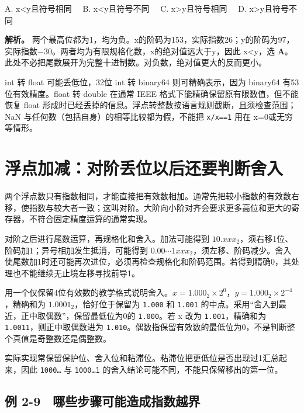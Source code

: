 A. x\textless y且符号相同　 B. x\textless y且符号不同　 C. x\textgreater y且符号相同　 D. x\textgreater y且符号不同


\textbf{解析。} 两个最高位都为1，均为负。x的阶码为153，实际指数26；y的阶码为97，实际指数−30。两者均为有限规格化数，x的绝对值远大于y，因此 x\textless y，选 \textbf{A}。此处不必把尾数展开为完整十进制数。对负数，绝对值更大的反而更小。

int 转 float 可能丢低位，32位 int 转 binary64 则可精确表示，因为 binary64 有53位有效精度。float 转 double 在通常 IEEE 格式下能精确保留原有限数值，但不能恢复 float 形成时已经丢掉的信息。浮点转整数按语言规则截断，且须检查范围；NaN 与任何数（包括自身）的相等比较都为假，不能把 \allowbreak{}\texttt{x/x==1} 用在 x=0或无穷等情形。

\section{浮点加减：对阶丢位以后还要判断舍入}\label{co-02-08}

两个浮点数只有指数相同，才能直接把有效数相加。通常先把较小指数的有效数右移，使指数与较大者一致；这叫对阶。大阶向小阶对齐会要求更多高位和更大的寄存器，不符合固定精度运算的通常实现。

对阶之后进行尾数运算，再规格化和舍入。加法可能得到 \(10.xxx_2\)，须右移1位、阶码加1；异号相加发生抵消，可能得到 \(0.00\cdots1xxx_2\)，须左移、阶码减少。舍入使尾数加1时还可能再次进位，必须再检查规格化和阶码范围。若得到精确0，其处理也不能继续无止境左移寻找前导1。

用一个仅保留4位有效数的教学格式说明舍入。\(x=1.000_2\times2^0\)，\(y=1.000_2\times2^{-4}\)，精确和为 \(1.0001_2\)，恰好位于保留为 \allowbreak{}\texttt{1.000} 和 \allowbreak{}\texttt{1.001} 的中点。采用``舍入到最近，正中取偶数''，保留最低位为0的 \allowbreak{}\texttt{1.000}。若 x 改为 \allowbreak{}\texttt{1.001}，精确和为 \allowbreak{}\texttt{1.0011}，则正中取偶数进为 \allowbreak{}\texttt{1.010}。偶数指保留有效数的最低位为0，不是判断整个真值是奇整数还是偶整数。

实际实现常保留保护位、舍入位和粘滞位。粘滞位把更低位是否出现过1汇总起来，因此 \allowbreak{}\texttt{1000…} 与 \allowbreak{}\texttt{1000…1} 的舍入结论可能不同，不能只保留移出的第一位。


\subsection{例 2-9　哪些步骤可能造成指数越界}\label{co-ex2-9}

